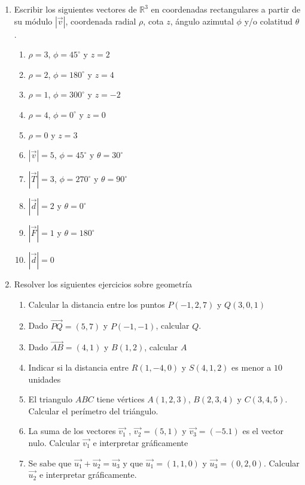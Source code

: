 \documentclass[a4paper]{article}
\newcommand{\exercise}{\item}
\newcommand{\vect}[1]{\overrightarrow{#1}}
\newcommand{\degs}{^{\circ}}
\begin{document}
\begin{enumerate}
\begin{multicols}{2}
\begin{enumerate} [label=(\alph*)]
		\item $(2,3,4)$
		\item $(3,-4,0)$
		\item $(0,5,0)$
	\end{enumerate}
	\end{multicols}
	\exercise Escribir los siguientes vectores de $\mathbb{R}^3$ en coordenadas rectangulares a partir de su módulo $|\vec{v}|$, coordenada radial $\rho$, cota $z$, ángulo azimutal $\phi$ y/o colatitud $\theta$.
	\begin{multicols}{2}
	\begin{enumerate} [label=(\alph*)]
		\item $\rho=3$, $\phi=45\degs$ y $z=2$
		\item $\rho=2$, $\phi=180\degs$ y $z=4$
		\item $\rho=1$, $\phi=300\degs$ y $z=-2$
		\item $\rho=4$, $\phi=0\degs$ y $z=0$
		\item $\rho=0$ y $z=3$
		\item $\left|\vec{v}\right|=5$, $\phi=45\degs$ y $\theta=30\degs$
		\item $\left|\vec{T}\right|=3$, $\phi=270\degs$ y $\theta=90\degs$
		\item $\left|\vec{d}\right|=2$ y $\theta=0\degs$
		\item $\left|\vec{F}\right|=1$ y $\theta=180\degs$
		\item $\left|\vec{d}\right|=0$
	\end{enumerate}
	\end{multicols}
	\exercise Resolver los siguientes ejercicios sobre geometría
	\begin{enumerate} [label=(\alph*)]
		\item Calcular la distancia entre los puntos $P(-1,2,7)$ y $Q(3,0,1)$
		\item Dado $\vect{PQ}=(5,7)$ y $P(-1,-1)$, calcular $Q$.
		\item Dado $\vect{AB}=(4,1)$ y $B(1,2)$, calcular $A$
		\item Indicar si la distancia entre $R(1,-4,0)$ y $S(4,1,2)$ es menor a $10$ unidades
		\item El triangulo $ABC$ tiene vértices $A(1,2,3)$, $B(2,3,4)$ y $C(3,4,5)$. Calcular el perímetro del triángulo.
		\item La suma de los vectores $\vect{v_1}$ , $\vect{v_2}=(5,1)$ y $\vect{v_3} = (-5.1)$ es el vector nulo. Calcular $\vect{v_1}$ e interpretar gráficamente
		\item Se sabe que $\vect{u_1} + \vect{u_2} = \vect{u_3}$ y que $\vect{u_1} = (1,1,0)$ y $\vect{u_3}=(0,2,0)$. Calcular $\vect{u_2}$ e interpretar gráficamente.

\end{enumerate}
\end{enumerate}
\end{document}
